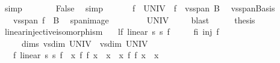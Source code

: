 \begin{isabellebody}
\ simp\isanewline
\ \ \ \ \isamarkupfalse%
\ \isamarkupfalse%
\ False\ \isamarkupfalse%
\ simp\isanewline
\ \ \isamarkupfalse%
\isanewline
\ \ \isamarkupfalse%
\ {\isachardoublequoteopen}f\ {\isacharbackquote}{\kern0pt}\ UNIV\ {\isacharequal}{\kern0pt}\ f\ {\isacharbackquote}{\kern0pt}\ vs{}{\isachardot}{\kern0pt}span\ B{}{\isachardoublequoteclose}\ \isamarkupfalse%
\ vs{}{\isachardot}{\kern0pt}span{\isacharunderscore}{\kern0pt}Basis\ \isacommand{{\isachardot}{\kern0pt}{\isachardot}{\kern0pt}}\isamarkupfalse%
\isanewline
\ \ \isamarkupfalse%
\ \isamarkupfalse%
\ {\isachardoublequoteopen}{\isasymdots}\ {\isacharequal}{\kern0pt}\ vs{}{\isachardot}{\kern0pt}span\ {\isacharparenleft}{\kern0pt}f\ {\isacharbackquote}{\kern0pt}\ B{}{\isacharparenright}{\kern0pt}{\isachardoublequoteclose}\ \isamarkupfalse%
\ span{\isacharunderscore}{\kern0pt}image\ \isacommand{{\isachardot}{\kern0pt}{\isachardot}{\kern0pt}}\isamarkupfalse%
\isanewline
\ \ \isamarkupfalse%
\ \isamarkupfalse%
\ {\isachardoublequoteopen}{\isasymdots}\ {\isacharequal}{\kern0pt}\ UNIV{\isachardoublequoteclose}\ \isamarkupfalse%
\ {\isacharasterisk}{\kern0pt}\ \isamarkupfalse%
\ blast\isanewline
\ \ \isamarkupfalse%
\ \isamarkupfalse%
\ {\isacharquery}{\kern0pt}thesis\ \isacommand{{\isachardot}{\kern0pt}}\isamarkupfalse%
\isanewline
{}\isamarkupfalse%
%
\endisatagproof
{\isafoldproof}%
%
\isadelimproof
\isanewline
%
\endisadelimproof
\isanewline
{}\isamarkupfalse%
\ linear{\isacharunderscore}{\kern0pt}injective{\isacharunderscore}{\kern0pt}isomorphism{\isacharcolon}{\kern0pt}\isanewline
\ \ \ lf{\isacharcolon}{\kern0pt}\ {\isachardoublequoteopen}linear\ s{}\ s{}\ f{\isachardoublequoteclose}\isanewline
\ \ \ \ \ fi{\isacharcolon}{\kern0pt}\ {\isachardoublequoteopen}inj\ f{\isachardoublequoteclose}\isanewline
\ \ \ \ \ dims{\isacharcolon}{\kern0pt}\ {\isachardoublequoteopen}vs{}{\isachardot}{\kern0pt}dim\ UNIV\ {\isacharequal}{\kern0pt}\ vs{}{\isachardot}{\kern0pt}dim\ UNIV{\isachardoublequoteclose}\isanewline
\ \ \ {\isachardoublequoteopen}{\isasymexists}f{\isacharprime}{\kern0pt}{\isachardot}{\kern0pt}\ linear\ s{}\ s{}\ f{\isacharprime}{\kern0pt}\ {\isasymand}\ {\isacharparenleft}{\kern0pt}{\isasymforall}x{\isachardot}{\kern0pt}\ f{\isacharprime}{\kern0pt}\ {\isacharparenleft}{\kern0pt}f\ x{\isacharparenright}{\kern0pt}\ {\isacharequal}{\kern0pt}\ x{\isacharparenright}{\kern0pt}\ {\isasymand}\ {\isacharparenleft}{\kern0pt}{\isasymforall}x{\isachardot}{\kern0pt}\ f\ {\isacharparenleft}{\kern0pt}f{\isacharprime}{\kern0pt}\ x{\isacharparenright}{\kern0pt}\ {\isacharequal}{\kern0pt}\ x{\isacharparenright}{\kern0pt}{\isachardoublequoteclose}\isanewline

\end{isabellebody}
